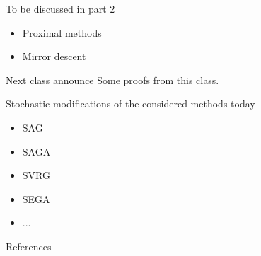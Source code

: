\documentclass{beamer}
\begin{document}
\begin{frame}{To be discussed in part 2}
\begin{itemize}
\item Proximal methods
\item Mirror descent
\end{itemize}
\end{frame}

\begin{frame}{Next class announce}
Some proofs from this class.

Stochastic modifications of the considered methods today
\begin{itemize}
\item SAG
\item SAGA
\item SVRG
\item SEGA
\item ...
\end{itemize}
\end{frame}

\begin{frame}[allowframebreaks]{References}

\nocite{nesterov1983method}\nocite{beck2017first}
\nocite{polyak1964some} \nocite{o2015adaptive}\nocite{nemirovsky1983problem} \nocite{su2014differential}


\end{frame}
\end{document}
